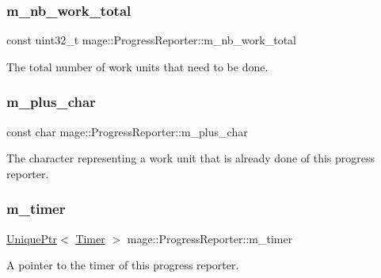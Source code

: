 \subsubsection{\texorpdfstring{m\+\_\+nb\+\_\+work\+\_\+total}{m\_nb\_work\_total}}
{\footnotesize\ttfamily const uint32\+\_\+t mage\+::\+Progress\+Reporter\+::m\+\_\+nb\+\_\+work\+\_\+total\hspace{0.3cm}{\ttfamily [private]}}

The total number of work units that need to be done. \hypertarget{classmage_1_1_progress_reporter_ab3c8d12e79e63ae2b99fde8d6627c230}{}\label{classmage_1_1_progress_reporter_ab3c8d12e79e63ae2b99fde8d6627c230} 
\subsubsection{\texorpdfstring{m\+\_\+plus\+\_\+char}{m\_plus\_char}}
{\footnotesize\ttfamily const char mage\+::\+Progress\+Reporter\+::m\+\_\+plus\+\_\+char\hspace{0.3cm}{\ttfamily [private]}}

The character representing a work unit that is already done of this progress reporter. \hypertarget{classmage_1_1_progress_reporter_a4c5c81ce84ceaab7764bd640a18db788}{}\label{classmage_1_1_progress_reporter_a4c5c81ce84ceaab7764bd640a18db788} 
\subsubsection{\texorpdfstring{m\+\_\+timer}{m\_timer}}
{\footnotesize\ttfamily \hyperlink{namespacemage_a8c307fbcc33bce9b7f2aa4c26c3b95cf}{Unique\+Ptr}$<$ \hyperlink{classmage_1_1_timer}{Timer} $>$ mage\+::\+Progress\+Reporter\+::m\+\_\+timer\hspace{0.3cm}{\ttfamily [private]}}

A pointer to the timer of this progress reporter. 